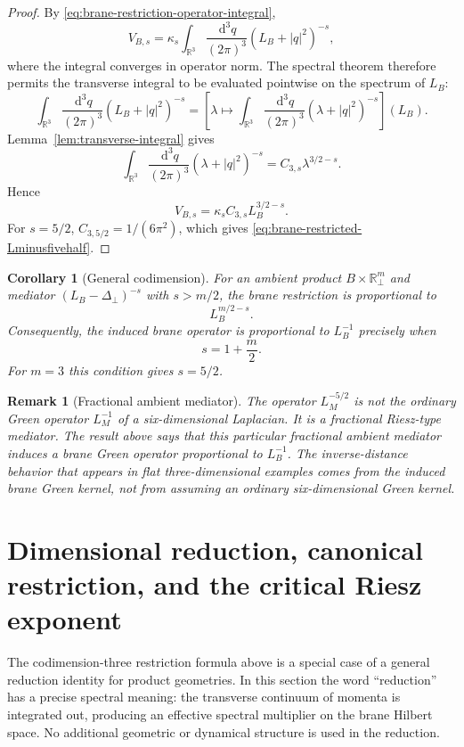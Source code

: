 \documentclass[11pt]{article}
\newtheorem{corollary}[theorem]{Corollary}
\newtheorem{remark}[theorem]{Remark}
\newcommand{\R}{\mathbb{R}}
\newcommand{\dd}{\,\mathrm{d}}
\begin{document}
\begin{proof}
By \eqref{eq:brane-restriction-operator-integral},
\[
    V_{B,s}
    =\kappa_s\int_{\R^3}\frac{\dd^3q}{(2\pi)^3}(L_B+|q|^2)^{-s},
\]
where the integral converges in operator norm.  The spectral theorem therefore permits the transverse integral to be evaluated pointwise on the spectrum of $L_B$:
\[
    \int_{\R^3}\frac{\dd^3q}{(2\pi)^3}(L_B+|q|^2)^{-s}
    =\left[\lambda\mapsto
      \int_{\R^3}\frac{\dd^3q}{(2\pi)^3}(\lambda+|q|^2)^{-s}
      \right](L_B).
\]
Lemma~\ref{lem:transverse-integral} gives
\[
    \int_{\R^3}\frac{\dd^3q}{(2\pi)^3}(\lambda+|q|^2)^{-s}
    =C_{3,s}\lambda^{3/2-s}.
\]
Hence
\[
    V_{B,s}=\kappa_s C_{3,s}L_B^{3/2-s}.
\]
For $s=5/2$, $C_{3,5/2}=1/(6\pi^2)$, which gives \eqref{eq:brane-restricted-Lminusfivehalf}.
\end{proof}

\begin{corollary}[General codimension]
\label{cor:general-codimension}
For an ambient product $B\times\R^m_\perp$ and mediator $(L_B-\Delta_\perp)^{-s}$ with $s>m/2$, the brane restriction is proportional to
\[
    L_B^{m/2-s}.
\]
Consequently, the induced brane operator is proportional to $L_B^{-1}$ precisely when
\[
    s=1+\frac{m}{2}.
\]
For $m=3$ this condition gives $s=5/2$.
\end{corollary}

\begin{remark}[Fractional ambient mediator]
The operator $L_M^{-5/2}$ is not the ordinary Green operator $L_M^{-1}$ of a six-dimensional Laplacian.  It is a fractional Riesz-type mediator.  The result above says that this particular fractional ambient mediator induces a brane Green operator proportional to $L_B^{-1}$.  The inverse-distance behavior that appears in flat three-dimensional examples comes from the induced brane Green kernel, not from assuming an ordinary six-dimensional Green kernel.
\end{remark}

\section{Dimensional reduction, canonical restriction, and the critical Riesz exponent}
\label{sec:dimensional-reduction}

The codimension-three restriction formula above is a special case of a
general reduction identity for product geometries.  In this section the
word ``reduction'' has a precise spectral meaning: the transverse continuum
of momenta is integrated out, producing an effective spectral multiplier on
the brane Hilbert space.  No additional geometric or dynamical structure is
used in the reduction.
\end{document}
